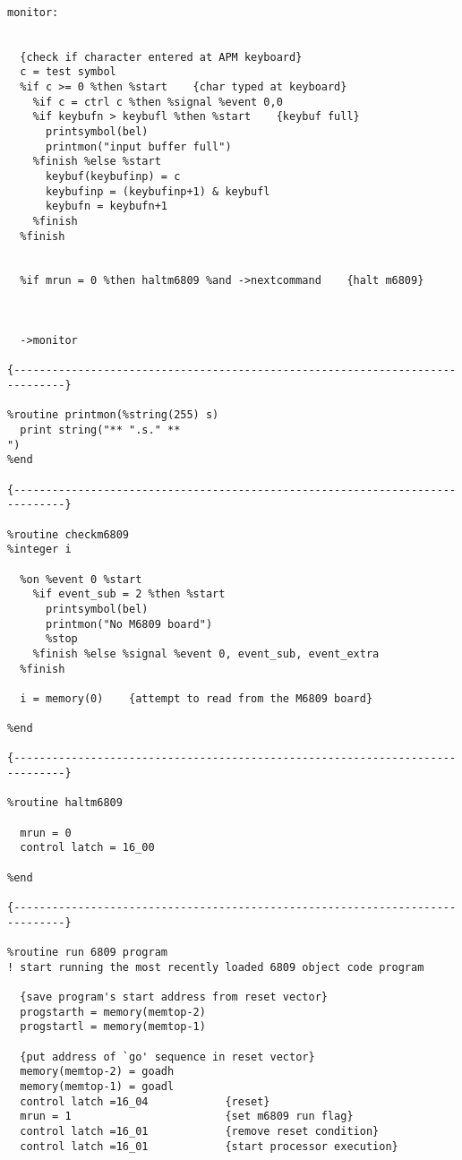 \begin{verbatim}

monitor:


  {check if character entered at APM keyboard}
  c = test symbol
  %if c >= 0 %then %start    {char typed at keyboard}
    %if c = ctrl c %then %signal %event 0,0
    %if keybufn > keybufl %then %start    {keybuf full}
      printsymbol(bel)
      printmon("input buffer full")
    %finish %else %start
      keybuf(keybufinp) = c
      keybufinp = (keybufinp+1) & keybufl
      keybufn = keybufn+1
    %finish
  %finish


  %if mrun = 0 %then haltm6809 %and ->nextcommand    {halt m6809}



  ->monitor

{------------------------------------------------------------------------------}

%routine printmon(%string(255) s)
  print string("** ".s." **
")
%end

{------------------------------------------------------------------------------}

%routine checkm6809
%integer i

  %on %event 0 %start
    %if event_sub = 2 %then %start
      printsymbol(bel)
      printmon("No M6809 board")
      %stop
    %finish %else %signal %event 0, event_sub, event_extra
  %finish

  i = memory(0)    {attempt to read from the M6809 board}

%end

{------------------------------------------------------------------------------}

%routine haltm6809

  mrun = 0
  control latch = 16_00

%end

{------------------------------------------------------------------------------}

%routine run 6809 program
! start running the most recently loaded 6809 object code program

  {save program's start address from reset vector}
  progstarth = memory(memtop-2)
  progstartl = memory(memtop-1)
  
  {put address of `go' sequence in reset vector}
  memory(memtop-2) = goadh
  memory(memtop-1) = goadl
  control latch =16_04            {reset}
  mrun = 1                        {set m6809 run flag}
  control latch =16_01            {remove reset condition}
  control latch =16_01            {start processor execution}
  

\end{verbatim}
